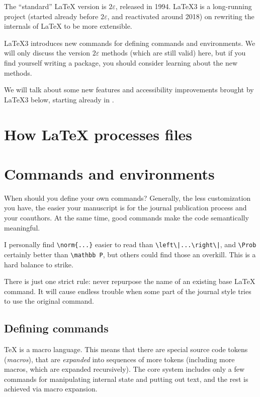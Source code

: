 \begin{latexthree}
The ``standard'' \LaTeX{} version is $2\varepsilon$, released in 1994.
\LaTeX3 is a long-running project (started already before $2\varepsilon$, and reactivated around 2018)
on rewriting the internals of \LaTeX{} to be more extensible.

\LaTeX3 introduces new commands for defining commands and environments.
We will only discuss the version $2\varepsilon$ methods (which are still valid) here,
but if you find yourself writing a package, you should consider learning about the new methods.

We will talk about some new features and accessibility improvements brought by \LaTeX3 below,
starting already in .
\end{latexthree}



%
%
%
\section{How \LaTeX{} processes files}





%
%
%
\section{Commands and environments}

\begin{practices}
When should you define your own commands?
Generally, the less customization you have,
the easier your manuscript is for the journal publication process and your coauthors.
At the same time, good commands make the code semantically meaningful.

I personally find \verb&\norm{...}& easier to read than \verb&\left\|...\right\|&,
and \verb|\Prob| certainly better than \verb|\mathbb P|,
but others could find those an overkill.
This is a hard balance to strike.

There is just one strict rule:
never repurpose the name of an existing base \LaTeX{} command.
It will cause endless trouble when some part of the journal style tries to use the original command.
\end{practices}


\subsection{Defining commands}
\TeX{} is a macro language.
This means that there are special source code tokens (\emph{macros}),
that are \emph{expanded} into sequences of more tokens
(including more macros, which are expanded recursively).
The core system includes only a few commands for manipulating internal state and putting out text,
and the rest is achieved via macro expansion.

